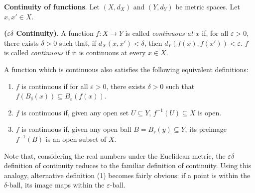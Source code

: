\begin{shaded}
    \textbf{Continuity of functions}. Let $(X,d_X)$ and $(Y,d_Y)$ be metric spaces. Let $x,x'\in X$.
    
    \begin{defn}
        \textbf{($\varepsilon\delta$ Continuity)}. A function $f:X\to Y$ is called \textit{continuous at $x$} if, for all $\varepsilon>0$, there exists $\delta>0$ such that, if $d_X(x,x')<\delta$, then $d_Y(f(x),f(x'))<\varepsilon$. $f$ is called \textit{continuous} if it is continuous at every $x\in X$.
    
        A function which is continuous also satisfies the following equivalent definitions:\vspace{-1em}
        \begin{enumerate}
            \item $f$ is continuous if for all $\varepsilon>0$, there exists $\delta>0$ such that $f(B_\delta(x))\subseteq B_\varepsilon(f(x))$.
            \item $f$ is continuous if, given any open set $U\subseteq Y$, $f^{-1}(U)\subseteq X$ is open.
            \item $f$ is continuous if, given any open ball $B=B_r(y)\subseteq Y$, its preimage $f^{-1}(B)$ is an open subset of $X$.
        \end{enumerate}
    \end{defn}
\end{shaded}
Note that, considering the real numbers under the Euclidean metric, the $\varepsilon\delta$ definition of continuity reduces to the familiar definition of continuity. Using this analogy, alternative definition (1) becomes fairly obvious: if a point is within the $\delta$-ball, its image maps within the $\varepsilon$-ball. 

